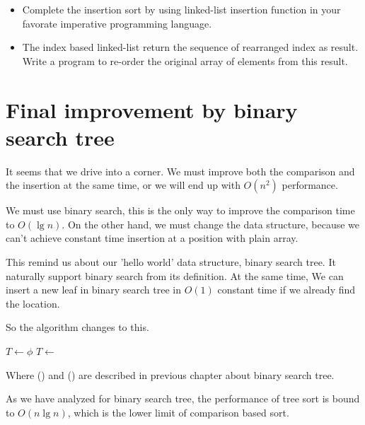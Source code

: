\documentclass[UTF8]{article}
\begin{document}
\begin{Exercise}
\begin{itemize}
\item Complete the insertion sort by using linked-list insertion function
in your favorate imperative programming language.
\item The index based linked-list return the sequence of rearranged index
as result. Write a program to re-order the original array of elements from
this result.
\end{itemize}
\end{Exercise}


\section{Final improvement by binary search tree}

It seems that we drive into a corner. We must improve both the comparison
and the insertion at the same time, or we will end up with $O(n^2)$ performance.

We must use binary search, this is the only way to improve the comparison
time to $O(\lg n)$. On the other hand, we must change the data structure,
because we can't achieve constant time insertion at a position with
plain array.

This remind us about our 'hello world' data structure, binary search tree.
It naturally support binary search from its definition. At the same time,
We can insert a new leaf in binary search tree in $O(1)$ constant time
if we already find the location.

So the algorithm changes to this.

\begin{algorithmic}
  \State $T \gets \phi$
    \State $T \gets $ 
  \EndFor
  \State \Return {}
\EndFunction
\end{algorithmic}

Where () and () are described in
previous chapter about binary search tree.

As we have analyzed for binary search tree, the performance of tree sort
is bound to $O(n \lg n)$, which is the lower limit of comparison based
sort\cite{Knuth}.
\end{document}
